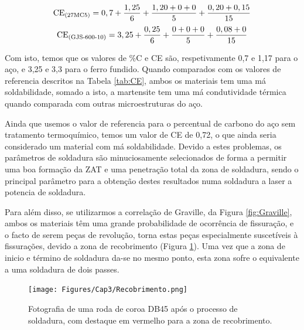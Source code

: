 \begin{equation}
    \centering
    \label{eq:CE_calculado_27MC5}
    \mathrm{CE\textsubscript{(27MC5)}} = 0,7 + \frac{1,25}{6}+\frac{1,20+0+0}{5}+\frac{0,20+0,15}{15}
\end{equation}
\begin{equation}
    \centering
    \label{eq:CE_calculado_GJS-600-10}
    \mathrm{CE\textsubscript{(GJS-600-10)}} = 3,25 + \frac{0,25}{6}+\frac{0+0+0}{5}+\frac{0,08+0}{15}
\end{equation}
\par
Com isto, temos que os valores de \%C e CE são, respetivamente 0,7 e 1,17 para o aço, e 3,25 e 3,3 para o ferro fundido. Quando comparados com os valores de referencia descritos na Tabela \ref{tab:CE}, ambos os materiais tem uma má soldabilidade, somado a isto, a martensite tem uma má condutividade térmica quando comparada com outras microestruturas do aço. 
\par
Ainda que usemos o valor de referencia para o percentual de carbono do aço sem tratamento termoquímico, temos um valor de CE de 0,72, o que ainda seria considerado um material com má soldabilidade. Devido a estes problemas, os parâmetros de soldadura são minuciosamente selecionados de forma a permitir uma boa formação da ZAT e uma penetração total da zona de soldadura, sendo o principal parâmetro para a obtenção destes resultados numa soldadura a laser a potencia de soldadura.
\newpage
\par
Para além disso, se utilizarmos a correlação de Graville, da Figura \ref{fig:Graville}, ambos os materiais têm uma grande probabilidade de ocorrência de fissuração, e o facto de serem peças de revolução, torna estas peças especialmente suscetíveis à fissurações, devido a zona de recobrimento (Figura \ref{fig:recobrimento}). Uma vez que a zona de inicio e término de soldadura da-se no mesmo ponto, esta zona sofre o equivalente a uma soldadura de dois passes. 
\begin{figure}[htb]
    \centering
    \texttt{[image: Figures/Cap3/Recobrimento.png]}
    \caption[Zona de recobrimento de uma roda de coroa DB45]%
    {Fotografia de uma roda de coroa DB45 após o processo de soldadura, com destaque em vermelho para a zona de recobrimento.}
    \label{fig:recobrimento}
\end{figure}
